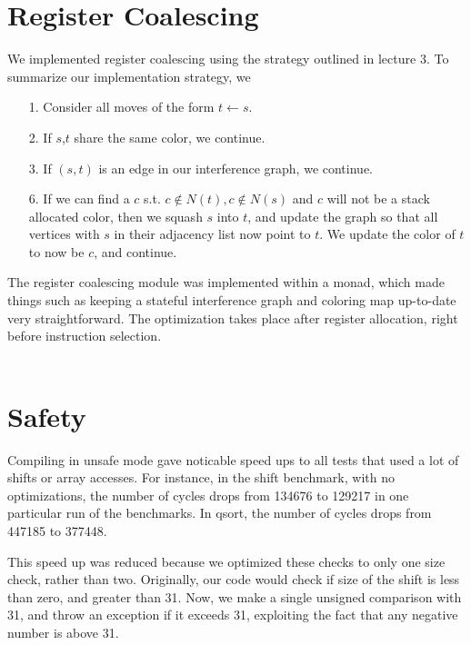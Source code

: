 \documentclass[11pt]{article}
\begin{document}
\section{Register Coalescing}
We implemented register coalescing using the strategy outlined in lecture 3. To summarize 
our implementation strategy, we 
\begin{itemize}
  \item [1.] Consider all moves of the form $t \leftarrow s$.
  \item [2.] If $s$,$t$ share the same color, we continue.
  \item [3.] If $(s,t)$ is an edge in our interference graph, we continue.
  \item [6.] If we can find a $c$ s.t. $c \notin N(t), c \notin N(s)$ and 
       $c$ will not be a stack allocated color, then we squash $s$
       into $t$, and update the graph so that all vertices with $s$
       in their adjacency list now point to $t$. We update the color
       of $t$ to now be $c$, and continue. 
\end{itemize}
The register coalescing module was implemented within a monad, which made things
such as keeping a stateful interference graph and coloring map up-to-date
very straightforward. The optimization takes place after register allocation, right before instruction
selection.\\
\\

\section{Safety}

Compiling in unsafe mode gave noticable speed ups to all tests that used a lot
of shifts or array accesses. For instance, in the shift benchmark, with no
optimizations, the number of cycles drops from 134676 to 129217 in one particular
run of the benchmarks. In qsort, the number of cycles drops from 447185 to
377448.

This speed up was reduced because we optimized these checks to only one size
check, rather than two. Originally, our code would check if size of the shift is less than zero, and
greater than 31. Now, we make a single unsigned comparison with 31, and throw
an exception if it exceeds 31, exploiting the fact that any negative number is
above 31.
\end{document}
